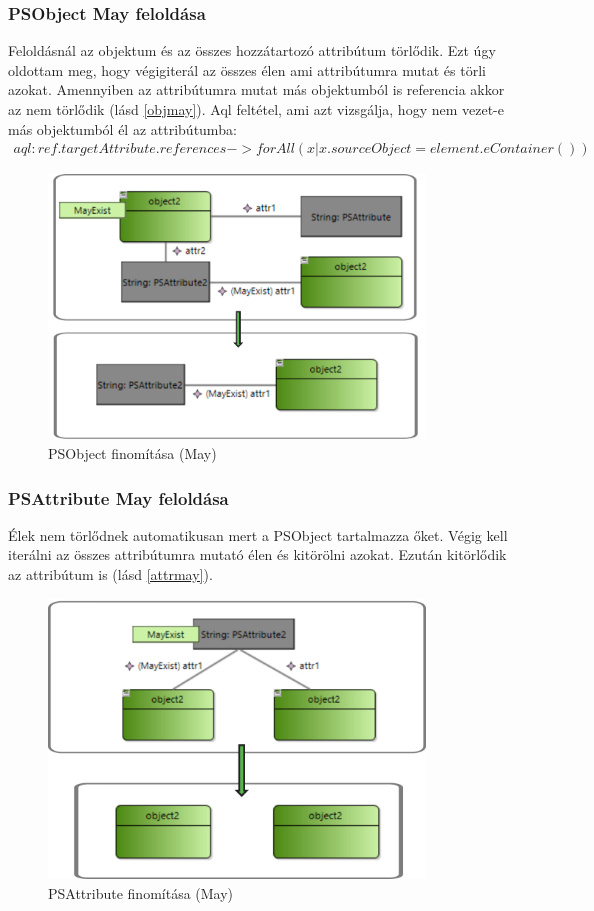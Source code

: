 \subsubsection{PSObject May feloldása}
Feloldásnál az objektum és az összes hozzátartozó attribútum törlődik. Ezt úgy oldottam meg, hogy végigiterál az összes élen ami attribútumra mutat és törli azokat. Amennyiben az attribútumra mutat más objektumból is referencia akkor az nem törlődik (lásd \autoref{objmay}).
Aql feltétel, ami azt vizsgálja, hogy nem vezet-e más objektumból él az attribútumba:
\begin{align}
 aql:ref.targetAttribute.references->forAll(x | x.sourceObject = element.eContainer())
\end{align}
\begin{figure}[!ht]
	\centering
	\includegraphics[width=100mm]{figures/objmay.pdf}
	\caption{PSObject finomítása (May)}
	\label{objmay} 
\end{figure}

\subsubsection{PSAttribute May feloldása}
Élek nem törlődnek automatikusan mert a PSObject tartalmazza őket. Végig kell iterálni az összes attribútumra mutató élen és kitörölni azokat. Ezután kitörlődik az attribútum is (lásd \autoref{attrmay}). 
\begin{figure}[!ht]
	\centering
	\includegraphics[width=100mm]{figures/attrmay.pdf}
	\caption{PSAttribute finomítása (May)}
	\label{attrmay} 
\end{figure}

